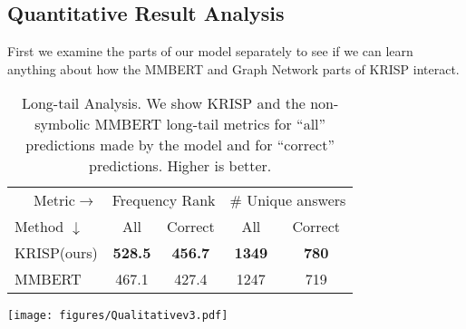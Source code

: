 \documentclass[final]{cvpr}
\providecommand{\ModelName}{KRISP\xspace}
\providecommand{\MMBERTBase}{Multi-modal BERT\xspace}
\providecommand{\MMBERTAbr}{MMBERT\xspace}
\providecommand{\sectionvspace}{\vspace{-0cm}}
\begin{document}
\subsection{Quantitative Result Analysis}
\label{sec:quantanalysis}
\sectionvspace
First we examine the parts of our model separately to see if we can learn anything about how the \MMBERTAbr and Graph Network parts of \ModelName interact. 

\begin{table}[t]
\begin{center}
\begin{tabular}{@{}lcccc@{}}
\toprule
\multicolumn{1}{r}{Metric$\rightarrow$}&\multicolumn{2}{c}{Frequency Rank}&\multicolumn{2}{c}{\# Unique answers}\\
Method $\downarrow$ & All & Correct & All  & Correct \\ \midrule
\ModelName (ours) & \textbf{528.5} & \textbf{456.7} & \textbf{1349} & \textbf{780} \\
\MMBERTAbr  & 467.1 & 427.4 & 1247 & 719 \\
\bottomrule
\end{tabular}
\end{center}
\caption{Long-tail Analysis. We show \ModelName and the non-symbolic  \MMBERTAbr long-tail metrics for ``all'' predictions made by the model and for ``correct'' predictions. Higher is better.}
\label{table:LongTail}
\vspace{-.2cm}
\end{table}

\begin{figure*}[t]
\centering
\texttt{[image: figures/Qualitativev3.pdf]}
\caption{Qualitative examples from \ModelName. Showing predictions by our model and the implicit knowledge baseline \MMBERTBase. We show the question, image, and answers given by both models. We also show knowledge in the graph related to the question, answers or image that seemed most relevant.}
\label{fig:qualitative}
\vspace{-.2cm}
\end{figure*}
\end{document}
